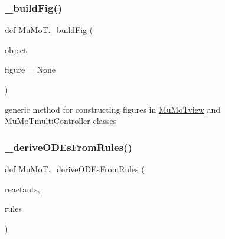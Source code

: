 \subsubsection{\texorpdfstring{\+\_\+build\+Fig()}{\_buildFig()}}
{\footnotesize\ttfamily def Mu\+Mo\+T.\+\_\+build\+Fig (\begin{DoxyParamCaption}\item[{}]{object,  }\item[{}]{figure = {\ttfamily None} }\end{DoxyParamCaption})\hspace{0.3cm}{\ttfamily [private]}}



generic method for constructing figures in \hyperlink{class_mu_mo_t_1_1_mu_mo_tview}{Mu\+Mo\+Tview} and \hyperlink{class_mu_mo_t_1_1_mu_mo_tmulti_controller}{Mu\+Mo\+Tmulti\+Controller} classes 

\mbox{\label{namespace_mu_mo_t_a276566fb102dd4e4bf32a9ba4fb8a09b}} 
\subsubsection{\texorpdfstring{\+\_\+derive\+O\+D\+Es\+From\+Rules()}{\_deriveODEsFromRules()}}
{\footnotesize\ttfamily def Mu\+Mo\+T.\+\_\+derive\+O\+D\+Es\+From\+Rules (\begin{DoxyParamCaption}\item[{}]{reactants,  }\item[{}]{rules }\end{DoxyParamCaption})\hspace{0.3cm}{\ttfamily [private]}}

\mbox{\label{namespace_mu_mo_t_aa6bfa694d197771fda158f6e3b278293}} 
